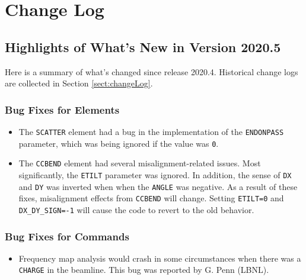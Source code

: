 \documentclass[11pt]{article}
\begin{document}
\newpage

\section{Change Log\label{sect:changeLog}}

\subsection{Highlights of What's New in Version 2020.5}

Here is a summary of what's changed since release 2020.4.  Historical change logs are collected in Section
\ref{sect:changeLog}.

\subsubsection{Bug Fixes for Elements}

\begin{itemize}
\item The \verb|SCATTER| element had a bug in the implementation of the \verb|ENDONPASS| parameter, which was being
  ignored if the value was \verb|0|.
\item The \verb|CCBEND| element had several misalignment-related issues. Most significantly, the \verb|ETILT| parameter was ignored.
  In addition, the sense of \verb|DX| and \verb|DY| was inverted when when the \verb|ANGLE| was negative. 
  As a result of these fixes, misalignment effects from \verb|CCBEND| will change. Setting \verb|ETILT=0| and
  \verb|DX_DY_SIGN=-1| will cause the code to revert to the old behavior.
\end{itemize}

\subsubsection{Bug Fixes for Commands}
\begin{itemize}
\item Frequency map analysis would crash in some circumstances when there was a \verb|CHARGE| in the beamline.
  This bug was reported by G. Penn (LBNL).
\end{itemize}
\end{document}
